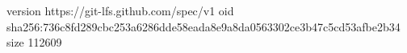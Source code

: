 version https://git-lfs.github.com/spec/v1
oid sha256:736c8fd289cbc253a6286dde58eada8e9a8da0563302ce3b47c5cd53afbe2b34
size 112609
